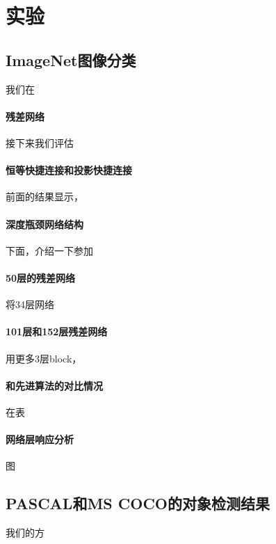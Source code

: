 
\section{实验}

\subsection{ImageNet图像分类}

我们在


\paragraph*{残差网络}
接下来我们评估

\paragraph*{恒等快捷连接和投影快捷连接}
前面的结果显示，

\paragraph*{深度瓶颈网络结构}
下面，介绍一下参加

\paragraph*{50层的残差网络}
将34层网络

\paragraph*{101层和152层残差网络}
用更多3层block，

\paragraph*{和先进算法的对比情况}
在表

\paragraph*{网络层响应分析}
图



\subsection{PASCAL和MS COCO的对象检测结果}

我们的方

